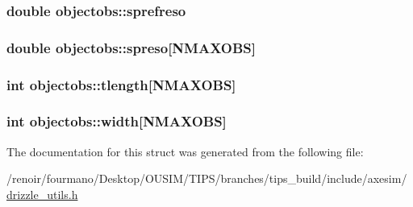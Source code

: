 \label{structobjectobs_ab76ccf40ceb7b963c8d811bce315fb66}
\hypertarget{structobjectobs_a4d0def177b0b4e6b6eb87c2ec4dc74ef}{
\subsubsection[{sprefreso}]{\setlength{\rightskip}{0pt plus 5cm}double {\bf objectobs::sprefreso}}}
\label{structobjectobs_a4d0def177b0b4e6b6eb87c2ec4dc74ef}
\hypertarget{structobjectobs_ae0d5808e8f584f9bc7d7b19cb7e29b12}{
\subsubsection[{spreso}]{\setlength{\rightskip}{0pt plus 5cm}double {\bf objectobs::spreso}\mbox{[}NMAXOBS\mbox{]}}}
\label{structobjectobs_ae0d5808e8f584f9bc7d7b19cb7e29b12}
\hypertarget{structobjectobs_a5918cb903ecff5ff7073fea76058fc45}{
\subsubsection[{tlength}]{\setlength{\rightskip}{0pt plus 5cm}int {\bf objectobs::tlength}\mbox{[}NMAXOBS\mbox{]}}}
\label{structobjectobs_a5918cb903ecff5ff7073fea76058fc45}
\hypertarget{structobjectobs_afbfe52c98ae6a2b8011260da343bc335}{
\subsubsection[{width}]{\setlength{\rightskip}{0pt plus 5cm}int {\bf objectobs::width}\mbox{[}NMAXOBS\mbox{]}}}
\label{structobjectobs_afbfe52c98ae6a2b8011260da343bc335}


The documentation for this struct was generated from the following file:\begin{DoxyCompactItemize}
\item 
/renoir/fourmano/Desktop/OUSIM/TIPS/branches/tips\_\-build/include/axesim/\hyperlink{drizzle__utils_8h}{drizzle\_\-utils.h}\end{DoxyCompactItemize}

